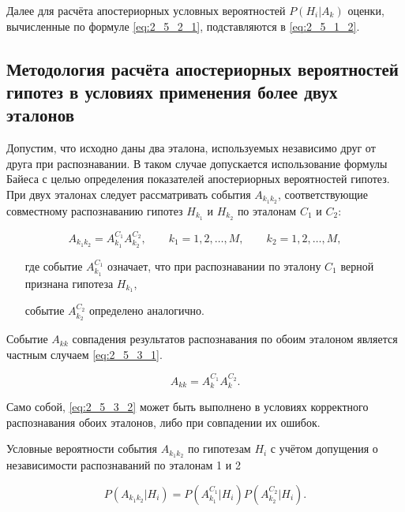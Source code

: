 Далее для расчёта апостериорных условных вероятностей $P(H_i|A_k)$ оценки, вычисленные по формуле \eqref{eq:2_5_2_1}, подставляются в \eqref{eq:2_5_1_2}.


\subsection{Методология расчёта апостериорных вероятностей гипотез в условиях применения более двух эталонов} \label{sect2_5_3}

Допустим, что исходно даны два эталона, используемых независимо друг от друга при распознавании.
В таком случае допускается использование формулы Байеса с целью определения показателей апостериорных вероятностей гипотез.
При двух эталонах следует рассматривать события $A_{k_1 k_2}$, соответствующие совместному распознаванию гипотез $H_{k_1}$ и $H_{k_2}$ по эталонам $C_1$ и $C_2$:

\begin{equation}\label{eq:2_5_3_1}
A_{k_1 k_2} = A_{k_1}^{C_1} A_{k_2}^{C_2},
\qquad
k_1 = 1, 2, \dots, M,
\qquad
k_2 = 1, 2, \dots, M,
\end{equation}
\begin{itemize}[align=left,leftmargin=1.8em,itemindent=0pt,labelsep=0pt,labelwidth=1.8em]
	\item[где] событие $A_{k_1}^{C_1}$ означает, что при распознавании по эталону $C_1$ верной признана гипотеза $H_{k_1}$,
	\item[] событие $A_{k_2}^{C_2}$ определено аналогично.
\end{itemize}

Событие $A_{kk}$ совпадения результатов распознавания по обоим эталоном является частным случаем \eqref{eq:2_5_3_1}.

\begin{equation}\label{eq:2_5_3_2}
A_{kk} = A_k^{C_1} A_k^{C_2}.
\end{equation}

Само собой, \eqref{eq:2_5_3_2} может быть выполнено в условиях корректного распознавания обоих эталонов, либо при совпадении их ошибок.

Условные вероятности события $A_{k_1 k_2}$ по гипотезам $H_i$ с учётом допущения о независимости распознаваний по эталонам 1 и 2

\begin{equation}\label{eq:2_5_3_3}
P(A_{k_1 k_2}|H_i) = P(A_{k_1}^{C_1}|H_i) P(A_{k_2}^{C_2}|H_i).
\end{equation}

